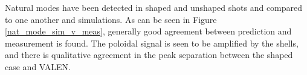 \documentclass[aps,preprint,showpacs,superscriptaddress,groupedaddress]{revtex4}  %
\begin{document}

	Natural modes have been detected in shaped and unshaped shots and compared to one another and simulations.  As can be seen in Figure \ref{nat_mode_sim_v_meas}, generally good agreement between prediction and measurement is found.  The poloidal signal is seen to be amplified by the shells, and there is qualitative agreement in the peak separation between the shaped case and VALEN.  %
\end{document}

